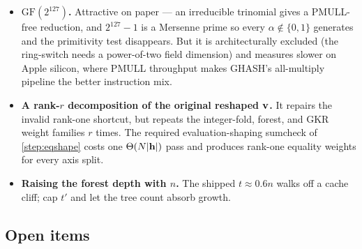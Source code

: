 \begin{itemize}[leftmargin=1.4em,itemsep=2pt,topsep=4pt]
  \item \textbf{$\mathrm{GF}(2^{127})$.} Attractive on paper --- an irreducible
        trinomial gives a PMULL-free reduction, and $2^{127}-1$ is a Mersenne
        prime so every $\alpha\notin\{0,1\}$ generates and the primitivity test
        disappears. But it is architecturally excluded (the ring-switch needs a
        power-of-two field dimension) and measures slower on Apple silicon,
        where PMULL throughput makes GHASH's all-multiply pipeline the better
        instruction mix.
  \item \textbf{A rank-$r$ decomposition of the original reshaped $\mathbf{v}$.}
        It repairs the invalid rank-one shortcut, but repeats the integer-fold,
        forest, and GKR weight families $r$ times.  The required
        evaluation-shaping sumcheck of \cref{step:eqshape} costs one
        $\Theta(N|\mathbf{h}|)$ pass and produces rank-one equality weights for every
        axis split.
  \item \textbf{Raising the forest depth with $n$.} The shipped
        $t\approx0.6n$ walks off a cache cliff; cap $t'$ and let the tree count
        absorb growth.
\end{itemize}

\subsection{Open items}

